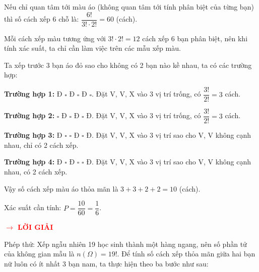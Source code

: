 \documentclass[12pt, a4paper]{article}
\begin{document}
	\noindent Nếu chỉ quan tâm tới màu áo (không quan tâm tới tính phân biệt của từng bạn) thì số cách xếp 6 chỗ là: $\dfrac{6!}{3! \cdot 2!} = 60$ (cách).
	
	\noindent Mỗi cách xếp màu tương ứng với $3! \cdot 2! = 12$ cách xếp 6 bạn phân biệt, nên khi tính xác suất, ta chỉ cần làm việc trên các mẫu xếp màu.
	
	\noindent Ta xếp trước 3 bạn áo đỏ sao cho không có 2 bạn nào kề nhau, ta có các trường hợp:
	
	\vspace{0.2cm}
	
	\noindent\textbf{Trường hợp 1:} Đ $\square$ Đ $\square$ Đ $\square$. Đặt V, V, X vào 3 vị trí trống, có $\dfrac{3!}{2!} = 3$ cách.
	
	\vspace{0.2cm}
	
	\noindent\textbf{Trường hợp 2:} $\square$ Đ $\square$ Đ $\square$ Đ. Đặt V, V, X vào 3 vị trí trống, có $\dfrac{3!}{2!} = 3$ cách.
	
	\vspace{0.2cm}
	
	\noindent\textbf{Trường hợp 3:} Đ $\square$ $\square$ Đ $\square$ Đ. Đặt V, V, X vào 3 vị trí sao cho V, V không cạnh nhau, chỉ có 2 cách xếp.
	
	\vspace{0.2cm}
	
	\noindent\textbf{Trường hợp 4:} Đ $\square$ Đ $\square$ $\square$ Đ. Đặt V, V, X vào 3 vị trí sao cho V, V không cạnh nhau, có 2 cách xếp.
	
	\vspace{0.2cm}
	
	\noindent Vậy số cách xếp màu áo thỏa mãn là $3 + 3 + 2 + 2 = 10$ (cách).
	
	\noindent Xác suất cần tính: $P = \dfrac{10}{60} = \dfrac{1}{6}$.
	
	\vspace{0.2cm}
			\noindent{}
	\vspace{0.2cm}
		\noindent \textbf{\textcolor{red}{$\rightarrow$ LỜI GIẢI}}
		
		\noindent Phép thử: Xếp ngẫu nhiên 19 học sinh thành một hàng ngang, nên số phần tử của không gian mẫu là \(n(\Omega) = 19!\). Để tính số cách xếp thỏa mãn giữa hai bạn nữ luôn có ít nhất 3 bạn nam, ta thực hiện theo ba bước như sau:
		
\end{document}
